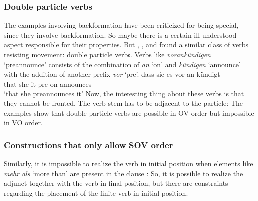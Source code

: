 \subsubsection{Double particle verbs}

The examples involving backformation have been criticized for being special, since they involve
backformation. So maybe there is a certain ill-understood aspect responsible for their properties. But
\citet[]{Haider93a},
\citet[]{Vikner2001a}, \citet{Fortmann2007a} and \citet[--60]{Haider2010a} found a similar
class of verbs resisting movement: double particle verbs. Verbs like \emph{vorankündigen} `preannounce'
consists of the combination of \emph{an} `on' and \emph{kündigen} `announce' with the addition of another prefix \emph{vor} `pre'.
\ea 
\label{ex-dass-sie-es-vorankündigt}
\gll dass sie es vor-an-kündigt\\
     that she it pre-on-announces\\
\glt `that she preannounces it'
\z
Now, the interesting thing about these verbs is that they cannot be fronted. The verb stem has to be
adjacent to the particle:
\eal
{}
\zl
The examples show that double particle verbs are possible in OV order but impossible in VO order.


\subsubsection{Constructions that only allow SOV order}

Similarly, it is impossible to realize the verb in initial position when elements like
\emph{mehr als} `more than' are present in the clause \parencites[Section~3.1]{Haider97c}[]{Meinunger2001a}: 
\eal
{}
\zl
So, it is possible to realize the adjunct together with the verb in final position, but there are
constraints regarding the placement of the finite verb in initial position.


